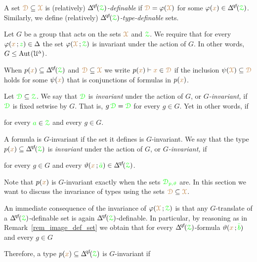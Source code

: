 A set ${\color{brown}\EuScript D}\subseteq{\color{brown}\EuScript X}$ is (relatively) \emph{$\qfDelta({\grZ})$-definable\/} if ${\color{brown}\EuScript D}=\varphi({\color{brown}\EuScript X})$ for some $\phi({\mr x})\in\qfDelta({\grZ})$.
Similarly, we define (relatively) \emph{$\qfDelta({\grZ})$-type-definable\/} sets.

\begin{assumption}\label{notation_GXphi}
  Let $G$ be a group that acts on the sets ${{\color{brown}\EuScript X}}$ and ${{\color{green}\EuScript Z}}$.
  We require that for every $\varphi({\color{brown} x}\,;{\color{green} z})\in\Delta$ the set $\varphi({\color{brown}\EuScript X}\,;{\color{green}\EuScript Z})$ is invariant under the action of $G$.
  In other words, $G\le{\rm Aut\kern.15ex}(\EuScript U\kern-.2ex^{\scriptscriptstyle\Delta})$.

  When $p({\mr x})\subseteq\qfDelta(\grZ)$ and ${{\color{brown}\EuScript D}}\subseteq{\color{brown}\EuScript X}$ we write $p({\color{brown} x})\vdash{\color{brown}x}\in{{\color{brown}\EuScript D}}$ if the inclusion $\psi({\color{brown}\EuScript X})\subseteq{{\color{brown}\EuScript D}}$ holds for some $\psi({\color{brown} x})$ that is conjunctions of formulas in $p({\color{brown} x})$.
\end{assumption}

Let ${\color{green}\EuScript D}\subseteq{\color{green}\EuScript Z}$.
We say that ${\color{green}\EuScript D}$ is \emph{invariant\/} under the action of $G$, or \emph{$G$-invariant,} if  ${\color{green}\EuScript D}$ is fixed setwise by $G$.
That is, $g\,{\color{green}\EuScript D}={\color{green}\EuScript D}$ for every $g\in G$.
Yet in other words, if

\hfill for every ${\color{green} a}\in{\color{green}\EuScript Z}$ and every $g\in G$.

A formula is $G$-invariant if the set it defines is $G$-invariant.
We say that the type $p({\mr x})\subseteq\qfDelta(\grZ)$ is \emph{invariant\/} under the action of $G$, or \emph{$G$-invariant,} if 

\hfill for every $g\in G$ and every $\theta({\mr x}\,;{\gr\bar a})\in\qfDelta(\grZ)$.

Note that $p({\color{brown} x})$ is $G$-invariant exactly when the sets ${\color{green}\EuScript D_{p,\vartheta}}$ are.
In this section we want to discuss the invariance of types using the sets ${\color{brown}\EuScript D}\subseteq{\color{brown}\EuScript X}$.

An immediate consequence of the invariance of $\varphi({\color{brown}\EuScript X}\,;{\color{green}\EuScript Z})$ is that any $G$-translate of a $\qfDelta({\grZ})$-definable set is again $\qfDelta({\grZ})$-definable.
In particular, by reasoning as in Remark~\ref{rem_image_def_set} we obtain that for every $\qfDelta({\grZ})$-formula $\vartheta({\color{brown} x}\,;{\color{green}\bar b})$ and every $g\in G$


Therefore, a type $p({\mr x})\subseteq\qfDelta(\grZ)$ is $G$-invariant if

